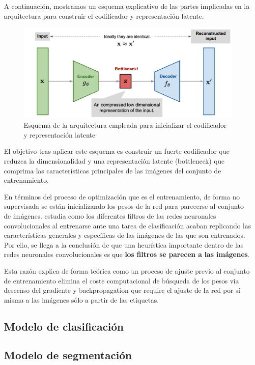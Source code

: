 A continuación, mostramos un esquema explicativo de las partes implicadas en la arquitectura para construir el codificador y representación latente.

\begin{figure}[H]
	\centering
	\includegraphics[width=1.0\linewidth]{imagenes/esquema_codificador.png}
	\caption{Esquema de la arquitectura empleada para inicializar el codificador y representación latente}
\end{figure}


El objetivo tras aplicar este esquema es construir un fuerte codificador que reduzca la dimensionalidad y una representación latente (bottleneck) que comprima las características principales de las imágenes del conjunto de entrenamiento.

En términos del proceso de optimización que es el entrenamiento, de forma no supervisada se están inicializando los pesos de la red para parecerse al conjunto de imágenes. \cite{zeiler2014visualizing} estudia como los diferentes filtros de las redes neuronales convolucionales al entrenarse ante una tarea de clasificación acaban replicando las características generales y específicas de las imágenes de las que son entrenados. Por ello, se llega a la conclusión de que una heurística importante dentro de las redes neuronales convolucionales es que \textbf{los filtros se parecen a las imágenes}. 

Esta razón explica de forma teórica como un proceso de ajuste previo al conjunto de entrenamiento elimina el coste computacional de búsqueda de los pesos via descenso del gradiente y backpropagation que require el ajuste de la red por sí misma a las imágenes sólo a partir de las etiquetas. 

\subsection{Modelo de clasificación}

\subsection{Modelo de segmentación}

